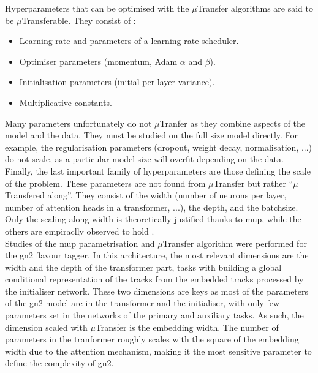Hyperparameters that can be optimised with the $\mu$Transfer algorithms are said to be $\mu$Transferable. They consist of \cite{yang2021tuning}: 
\begin{itemize}
  \item Learning rate and parameters of a learning rate scheduler.
  \item Optimiser parameters (momentum, Adam $\alpha$ and $\beta$).
  \item Initialisation parameters (initial per-layer variance).
  \item Multiplicative constants.
\end{itemize}
Many parameters unfortunately do not $\mu$Tranfer as they combine aspects of the model and the data. They must be studied on the full size model directly. For example, the regularisation parameters (dropout, weight decay, normalisation, ...) do not scale, as a particular model size will overfit depending on the data. Finally, the last important family of hyperparameters are those defining the scale of the problem. These parameters are not found from $\mu$Transfer but rather ``$\mu$Transfered along''. They consist of the width (number of neurons per layer, number of attention heads in a transformer, ...), the depth, and the batchsize. Only the scaling along width is theoretically justified thanks to \gls{mup}, while the others are empiraclly observed to hold \cite{yang2021tuning}.\\

Studies of the \gls{mup} parametrisation and $\mu$Transfer algorithm were performed for the \gls{gn2} flavour tagger. In this architecture, the most relevant dimensions are the width and the depth of the transformer part, tasks with building a global conditional representation of the tracks from the embedded tracks processed by the initialiser network. These two dimensions are keys as most of the parameters of the \gls{gn2} model are in the transformer and the initialiser, with only few parameters set in the networks of the primary and auxiliary tasks. As such, the dimension scaled with $\mu$Transfer is the embedding width. The number of parameters in the tranformer roughly scales with the square of the embedding width due to the attention mechanism, making it the most sensitive parameter to define the complexity of \gls{gn2}. 

